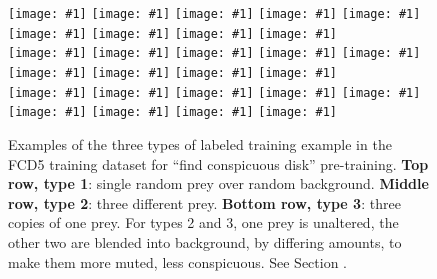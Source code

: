 \documentclass[letterpaper]{article}
\newcommand{\ignine}[1]{\texttt{[image: \#1]}}
\begin{document}
\begin{figure}
    \vspace{0.5cm}
    \ignine{20220303_UVSfqCzewt_38_20.png}
    \hfill
    \ignine{20220303_SBWaLRHOzk_56_33.png}
    \hfill
    \ignine{20220303_bUMqcbutgJ_25_78.png}
    \hfill
    \ignine{20220303_HZzUzWWqcC_54_28.png}
    \hfill
    \ignine{20220303_inuPKUxnHQ_72_71.png}
    \hfill
    \ignine{20220303_RRGCwhmcJc_101_84.png}
    \hfill
    \ignine{20220303_PYinyJAWaj_61_60.png}
    \hfill
    \ignine{20220303_TNXfhQtzYa_92_91.png}
    \hfill
    \ignine{20220303_cDMtFaTYKk_63_54.png}
    \\
    \vspace{0.1cm}
    \ignine{20220303_wIRPERwSCh_49_63.png}
    \hfill
    \ignine{20220303_edDsCjbHdf_61_92.png}
    \hfill
    \ignine{20220303_fGMFBgMQDX_93_86.png}
    \hfill
    \ignine{20220303_jQREPLQyuL_33_39.png}
    \hfill
    \ignine{20220303_ijBOHTccYX_104_101.png}
    \hfill
    \ignine{20220303_KAoOFAqFyU_80_58.png}
    \hfill
    \ignine{20220303_NExMwxEbzU_85_92.png}
    \hfill
    \ignine{20220303_kpcUyhHXOh_91_98.png}
    \hfill
    \ignine{20220303_oWPwPGkcSb_82_22.png}
    \\
    \vspace{0.1cm}
    \ignine{20220303_uAEPxMZbeo_83_45.png}
    \hfill
    \ignine{20220303_cADfBauZUV_47_32.png}
    \hfill
    \ignine{20220303_YAMfudJxeH_30_84.png}
    \hfill
    \ignine{20220303_JeyBgDfMcN_40_82.png}
    \hfill
    \ignine{20220303_OaOJaByhbU_90_55.png}
    \hfill
    \ignine{20220303_mhYpDjxaKf_78_57.png}
    \hfill
    \ignine{20220303_ASsEgFUlly_23_60.png}
    \hfill
    \ignine{20220303_nzgItDrYqT_71_99.png}
    \hfill
    \ignine{20220303_QuHYtnPora_72_73.png}
    \caption{Examples of the three types of labeled training example in the FCD5 training dataset for “find conspicuous disk” pre-training. \textbf{Top row, type 1}: single random prey over random background. \textbf{Middle row, type 2}: three different prey. \textbf{Bottom row, type 3}: three copies of one prey. For types 2 and 3, one prey is unaltered, the other two are blended into background, by differing amounts, to make them more muted, less conspicuous. See Section .}
    \label{fig:fcd5_examples}
\end{figure}

\end{document}
